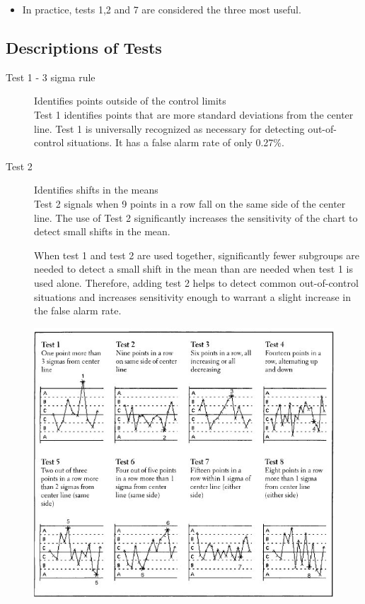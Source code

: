 \documentclass[]{report}
\begin{document}
{{\begin{itemize}
		\item In practice, tests 1,2 and 7 are considered the three most useful.
	\end{itemize}
}
{
	\large
	\subsection{Descriptions of Tests}
	\begin{description}
		\item[Test 1 - 3 sigma rule] Identifies points outside of the control limits\\
		Test 1 identifies points that are more standard deviations from the center line. Test 1 is
		universally recognized as necessary for detecting out-of-control situations. It has a
		false alarm rate of only 0.27\%.
		
		\item[Test 2] Identifies shifts in the means \\
		Test 2 signals when 9 points in a row fall on the same side of the center line.  The use of Test 2
		significantly increases the sensitivity of the chart to detect small shifts in the mean.
		
		When test 1 and test 2 are used together, significantly fewer subgroups are needed
		to detect a small shift in the mean than are needed when test 1 is used alone.
		Therefore, adding test 2 helps to detect common out-of-control situations and
		increases sensitivity enough to warrant a slight increase in the false alarm rate.
	\end{description}
}
\newpage
\begin{figure}[h!]
	\includegraphics[scale=0.85]{images/WECOtests}\\
\end{figure}


}
\end{document}
